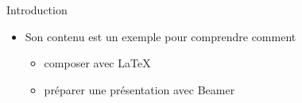 \documentclass[10pt,t]{beamer}
\begin{document}
\maketitle


\begin{frame}{Introduction} 

  \begin{itemize}
  \item Son contenu est un exemple pour comprendre comment

    \begin{itemize}
    \item composer avec \LaTeX{}
    \item préparer une présentation avec Beamer
    \end{itemize}

  \end{itemize}

  \pause


\end{frame}
\end{document}
